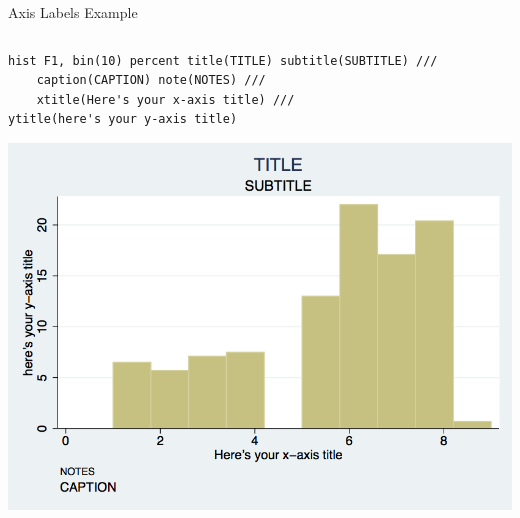 \documentclass[table,smaller]{beamer}
\begin{document}
\begin{frame}[fragile,label=sec-2-6]{Axis Labels Example}
 \vspace{-.5em} \begin{columns}  \begin{block}{}
\begin{verbatim}
hist F1, bin(10) percent title(TITLE) subtitle(SUBTITLE) ///
    caption(CAPTION) note(NOTES) ///
    xtitle(Here's your x-axis title) ///
ytitle(here's your y-axis title)
\end{verbatim}

\vspace{-1.5em}

\includegraphics[width=.9\linewidth]{./images/hist2.png}

\end{block} \end{columns}
\end{frame}
\end{document}
